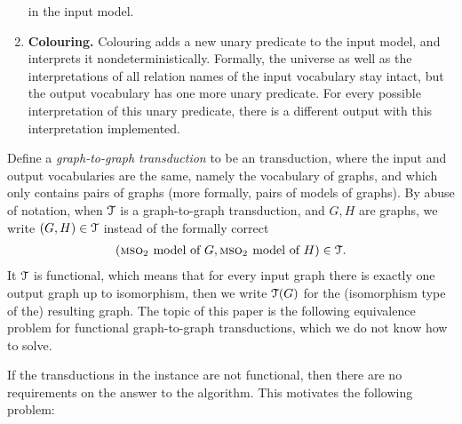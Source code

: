 \begin{definition}
\begin{enumerate}
	in the input model.
	\item {\bf Colouring.} Colouring adds  a new unary predicate to the input model, and interprets it nondeterministically. Formally, the universe as well as the interpretations of all relation names of the input vocabulary stay intact,
	but the output vocabulary has one more unary predicate. For every possible interpretation of this unary predicate, there is a different output with this interpretation implemented.
\end{enumerate}
\end{definition}



  Define a \emph{graph-to-graph \mso transduction} to be an \mso transduction, where the input and output vocabularies are the same, namely the vocabulary of graphs, and which only contains pairs of graphs (more formally, pairs of \msotwo models of graphs).  By abuse of notation, when ${\mathcal T}$ is a graph-to-graph \mso transduction, and $G,H$ are graphs, we write $(G,H) \in {\mathcal T}$ instead of the formally correct 
\begin{align*}
(\text{{\sc mso$_2$ }model of $G$}, \text{{\sc mso$_2$ }model of $H$})\in {\mathcal T}.
\end{align*}
It ${\mathcal T}$ is functional, which means that for every input graph there is exactly one output graph up to isomorphism, then we write ${\mathcal T}(G)$ for the (isomorphism type of the) resulting graph. 
The topic of this paper is   the following  equivalence problem for functional \mso graph-to-graph transductions, which  we do not know how to solve.



If the  transductions in the instance are not functional, then there are no requirements on the answer to the algorithm. This motivates the following problem:

    


